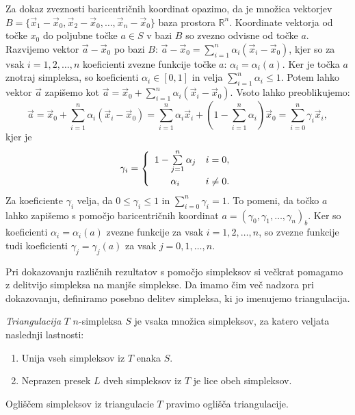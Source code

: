 \documentclass[mat1]{fmfdelo}
\newcommand{\R}{\mathbb R}
\newcommand{\0}{\underline{0}}
\begin{document}
\begin{dokaz}
Za dokaz zveznosti baricentričnih koordinat opazimo, da je množica vektorjev $B = \{ \vec{x}_1 - \vec{x}_0, \vec{x}_2 - \vec{x}_0, \dots, \vec{x}_{n} - \vec{x}_0 \}$ baza prostora $\R^n$. Koordinate vektorja od točke $x_0$ do poljubne točke $a \in S$ v bazi $B$ so zvezno odvisne od  točke $a$. Razvijemo vektor $\vec{a} - \vec{x}_0$ po bazi $B$: $\vec{a} - \vec{x}_0 = \sum\limits_{i=1}^n \alpha_i (\vec{x}_i - \vec{x}_0)$, kjer so za vsak $i = 1, 2, \dots, n$ koeficienti zvezne funkcije točke $a$: $\alpha_i = \alpha_i(a)$. Ker je točka $a$ znotraj simpleksa, so koeficienti $\alpha_i \in [0, 1]$ in velja $\sum\limits_{i=1}^n \alpha_i \leq 1$. Potem lahko vektor $\vec{a}$ zapišemo kot $\vec{a}= \vec{x}_0 + \sum\limits_{i=1}^n \alpha_i (\vec{x}_i - \vec{x}_0)$. Vsoto lahko preoblikujemo:
$$\vec{a}= \vec{x}_0 +  \sum_{i=1}^n \alpha_i (\vec{x}_i - \vec{x}_0) = \sum_{i=1}^n \alpha_i \vec{x}_i +(1 - \sum_{i=1}^n \alpha_i ) \vec{x}_0 = \sum_{i=0}^n \gamma_i \vec{x}_i,$$
kjer je
\[  \gamma_i =  \left\{
\begin{array}{cl}\vspace{3pt}
	1 -\sum\limits_{j=1}^n \alpha_j & i = 0,\\
	\alpha_i & i \neq 0. \\
\end{array} 
\right. \]
Za koeficiente $\gamma_i$ velja, da $0 \leq \gamma_i \leq 1$ in $\sum\limits_{i=0}^n \gamma_i = 1$. To pomeni, da točko $a$ lahko zapišemo s pomočjo baricentričnih koordinat $a = (\gamma_0, \gamma_1, \dots, \gamma_n)_b$. Ker so koeficienti $\alpha_i = \alpha_i(a)$ zvezne funkcije za vsak $i = 1, 2, \dots, n$, so zvezne funkcije tudi koeficienti $\gamma_j = \gamma_j(a)$ za vsak $j = 0, 1, \dots, n$.
\end{dokaz}
Pri dokazovanju različnih rezultatov s pomočjo simpleksov si večkrat pomagamo z delitvijo simpleksa na manjše simplekse. Da imamo čim več nadzora pri dokazovanju, definiramo posebno delitev simpleksa, ki jo imenujemo triangulacija.

\begin{definicija}
\emph{Triangulacija} $T$ $n$-simpleksa $S$ je vsaka množica simpleksov, za katero veljata naslednji lastnosti:
\begin{enumerate}
\item Unija vseh simpleksov iz $T$ enaka $S$.
\item Neprazen presek $L$ dveh simpleksov iz $T$ je lice obeh simpleksov.
\end{enumerate}
Ogliščem simpleksov iz triangulacie $T$ pravimo oglišča triangulacije.
\end{definicija}
\end{document}
